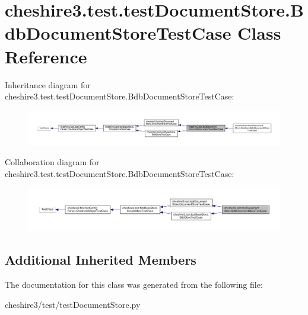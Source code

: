\hypertarget{classcheshire3_1_1test_1_1test_document_store_1_1_bdb_document_store_test_case}{\section{cheshire3.\-test.\-test\-Document\-Store.\-Bdb\-Document\-Store\-Test\-Case Class Reference}
\label{classcheshire3_1_1test_1_1test_document_store_1_1_bdb_document_store_test_case}
}


Inheritance diagram for cheshire3.\-test.\-test\-Document\-Store.\-Bdb\-Document\-Store\-Test\-Case\-:
\nopagebreak
\begin{figure}[H]
\begin{center}
\leavevmode
\includegraphics[width=350pt]{classcheshire3_1_1test_1_1test_document_store_1_1_bdb_document_store_test_case__inherit__graph}
\end{center}
\end{figure}


Collaboration diagram for cheshire3.\-test.\-test\-Document\-Store.\-Bdb\-Document\-Store\-Test\-Case\-:
\nopagebreak
\begin{figure}[H]
\begin{center}
\leavevmode
\includegraphics[width=350pt]{classcheshire3_1_1test_1_1test_document_store_1_1_bdb_document_store_test_case__coll__graph}
\end{center}
\end{figure}
\subsection*{Additional Inherited Members}


The documentation for this class was generated from the following file\-:\begin{DoxyCompactItemize}
\item 
cheshire3/test/test\-Document\-Store.\-py\end{DoxyCompactItemize}
